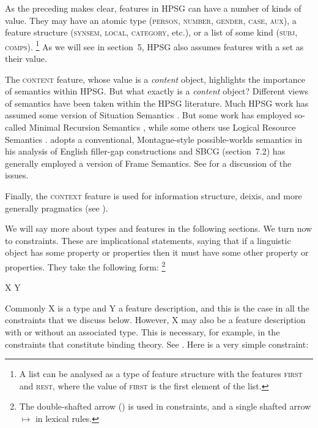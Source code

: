 \documentclass[output=paper
	        ,collection
	        ,collectionchapter
 	        ,biblatex
                ,babelshorthands
                ,newtxmath
                ,draftmode
                ,colorlinks, citecolor=brown
]{langscibook}
\begin{document}
As the preceding makes clear, features in HPSG can have a number of kinds of value. They may have an atomic type (\textsc{person, number, gender, case, aux}), a feature structure (\textsc{synsem, local, category}, etc.), or a list of some kind (\textsc{subj, comps}).%
%
\footnote{A list can be analysed as a type of feature structure with the features \textsc{first} and \textsc{rest}, where the value of \textsc{first} is the first element of the list.}
%
As we will see in section~5, HPSG also assumes features with a set as their value.

The \textsc{content} feature, whose value is a \emph{content} object, highlights the importance of semantics within HPSG. But what exactly is a \emph{content} object? Different views of semantics have been taken within the HPSG literature. Much HPSG work has assumed some version of Situation Semantics \citep{BP83a}. But some work has employed so-called Minimal Recursion Semantics \citep{CFPS2005a}, while some others use Logical Resource Semantics \citep{RichterandSailer2001}. \citet[501]{Sag2010b} adopts a conventional, Montague-style possible-worlds semantics in his analysis of English filler-gap constructions and SBCG (section~7.2) has generally employed a version of Frame Semantics. See  for a discussion of the issues.

Finally, the \textsc{context} feature is used for information structure, deixis, and more generally pragmatics (see ).

We will say more about types and features in the following sections. We turn now to constraints. These are implicational statements, saying that if a linguistic object has some property or properties then it must have some other property or properties. They take the following form:%
%
\footnote{The double-shafted arrow (\impl) is used in constraints, and a single shafted arrow $\mapsto$ in lexical rules.}
%

\ea\label{ex:prop10}
X \impl Y
\z

Commonly X is a type and Y a feature description, and this is the case in all the constraints that we discuss below. However, X may also be a feature description with or without an associated type. This is necessary, for example, in the constraints that constitute binding theory. See . Here is a very simple constraint:
\end{document}
